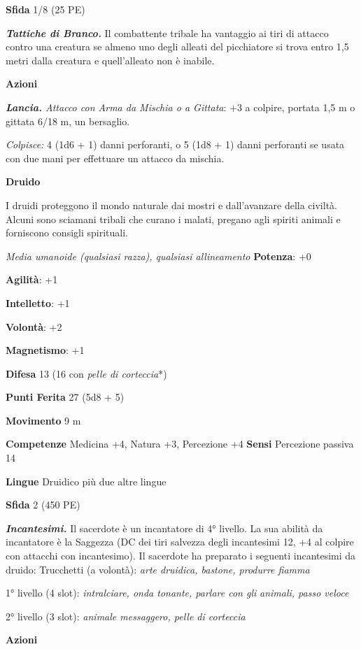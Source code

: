 \begin{multicols}{2}
\textbf{Sfida} 1/8 (25 PE)

\emph{\textbf{Tattiche di Branco.}} Il combattente tribale ha vantaggio
ai tiri di attacco contro una creatura se almeno uno degli alleati del
picchiatore si trova entro 1,5 metri dalla creatura e quell'alleato non
è inabile.

\textbf{Azioni}

\emph{\textbf{Lancia.} Attacco con Arma da Mischia o a Gittata}: +3 a
colpire, portata 1,5 m o gittata 6/18 m, un bersaglio.

\emph{Colpisce:} 4 (1d6 + 1) danni perforanti, o 5 (1d8 + 1) danni
perforanti se usata con due mani per effettuare un attacco da mischia.

\textbf{Druido}

I druidi proteggono il mondo naturale dai mostri e dall'avanzare della
civiltà. Alcuni sono sciamani tribali che curano i malati, pregano agli
spiriti animali e forniscono consigli spirituali.

\emph{Media umanoide (qualsiasi razza), qualsiasi allineamento}
\textbf{Potenza}: +0

\textbf{Agilità}: +1

\textbf{Intelletto}: +1

\textbf{Volontà}: +2

\textbf{Magnetismo}: +1

\textbf{Difesa} 13 (16 con \emph{pelle di corteccia}*)

\textbf{Punti Ferita} 27 (5d8 + 5)

\textbf{Movimento} 9 m

\textbf{Competenze} Medicina +4, Natura +3, Percezione +4 \textbf{Sensi}
Percezione passiva 14

\textbf{Lingue} Druidico più due altre lingue

\textbf{Sfida} 2 (450 PE)

\emph{\textbf{Incantesimi.}} Il sacerdote è un incantatore di 4°
livello. La sua abilità da incantatore è la Saggezza (DC dei tiri
salvezza degli incantesimi 12, +4 al colpire con attacchi con
incantesimo). Il sacerdote ha preparato i seguenti incantesimi da
druido: Trucchetti (a volontà): \emph{arte druidica, bastone, produrre
fiamma}

1° livello (4 slot): \emph{intralciare, onda tonante, parlare con gli}
\emph{animali, passo veloce}

2° livello (3 slot): \emph{animale messaggero, pelle di corteccia}

\textbf{Azioni}


\end{multicols}
